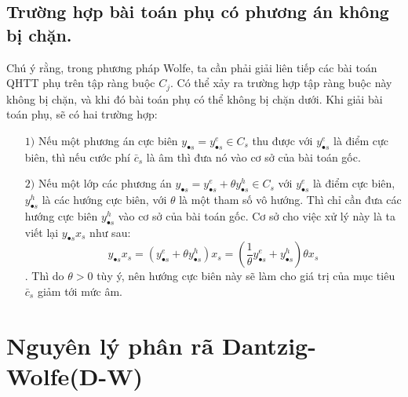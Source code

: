 \subsection{Trường hợp bài toán phụ có phương án không bị chặn. }
Chú ý rằng, trong phương pháp Wolfe, ta cần phải giải liên tiếp các bài toán QHTT phụ trên tập ràng buộc $C_j$. Có thể xảy ra trường hợp tập ràng buộc này không bị chặn, và khi đó bài toán phụ có thể không bị chặn dưới. Khi giải bài toán phụ, sẽ có hai trường hợp:
\begin{itemize}
\item [$1)$] Nếu một phương án cực biên $y_{\bullet s}=y^e_{\bullet s}\in C_s$ thu được với $y^e_{\bullet s}$ là điểm cực biên, thì nếu cước phí $\bar c_s$ là âm thì đưa nó vào cơ sở của bài toán gốc.
\item [$2)$] Nếu một lớp các phương án $y_{\bullet s}=y^e_{\bullet s}+\theta y^h_{\bullet s}\in C_s$ với $y^e_{\bullet s}$ là điểm cực biên, $y^h_{\bullet s}$ là các hướng cực biên, với $\theta$ là một tham số vô hướng. Thì chỉ cần đưa các hướng cực biên $y^h_{\bullet s}$ vào cơ sở của bài toán gốc. Cơ sở cho việc xử lý này là ta viết lại $y_{\bullet s}x_s$ như sau:
\begin{displaymath}
y_{\bullet s}x_s=(y^e_{\bullet s}+\theta y^h_{\bullet s})x_s=(
\frac{1}{\theta} y^e_{\bullet s}+y^h_{\bullet s})\theta x_s
\end{displaymath}.
Thì do $\theta>0$ tùy ý, nên hướng cực biên này sẽ làm cho giá trị của mục tiêu $\bar c_s$ giảm tới mức âm. 
\end{itemize}

\section{Nguyên lý phân rã Dantzig-Wolfe(D-W)}

